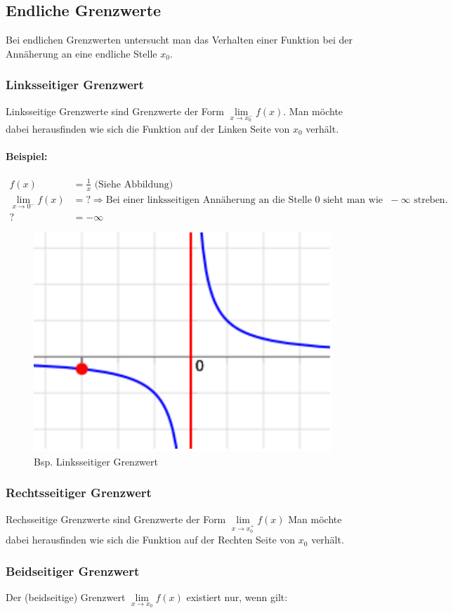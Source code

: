 \subsection{Endliche Grenzwerte}
Bei endlichen Grenzwerten untersucht man das Verhalten einer Funktion bei der Annäherung an eine endliche Stelle $x_0$.

\subsubsection{Linksseitiger Grenzwert}
Linksseitige Grenzwerte sind Grenzwerte der Form $\lim\limits_{x \rightarrow x_0^- }f(x)$. Man möchte dabei herausfinden wie sich die Funktion auf der Linken Seite von $x_0$ verhält.

\paragraph{Beispiel:}
\begin{align*}
	f(x) &= \frac{1}{x} \text{ (Siehe Abbildung)}\\
	\lim\limits_{x \rightarrow 0^-} f(x) &= ? \Rightarrow \text{Bei einer linksseitigen Annäherung an die Stelle 0 sieht man wie die Werte gegen } -\infty \text{ streben.}\\
	? &= -\infty
\end{align*}	

\begin{figure}[h]
\centering
\includegraphics[width=0.3\linewidth]{images/linksseitiger_limes}
\caption{Bsp. Linksseitiger Grenzwert}
\end{figure}


\subsubsection{Rechtsseitiger Grenzwert}
Rechsseitige Grenzwerte sind Grenzwerte der Form $\lim\limits_{x \rightarrow x_0^+ }f(x)$
Man möchte dabei herausfinden wie sich die Funktion auf der Rechten Seite von $x_0$ verhält.

\subsubsection{Beidseitiger Grenzwert}
Der (beidseitige) Grenzwert $\lim\limits_{x \rightarrow x_0} f(x)$ existiert nur, wenn gilt:

